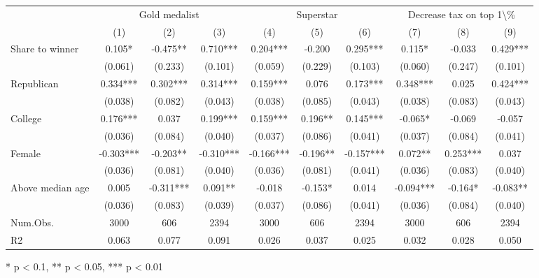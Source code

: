 \begin{table}[t]
\fontsize{12.0pt}{14.4pt}\selectfont
\begin{tabular*}{\linewidth}{@{\extracolsep{\fill}}lccccccccc}
\toprule
 & \multicolumn{3}{c}{Gold medalist} & \multicolumn{3}{c}{Superstar} & \multicolumn{3}{c}{Decrease tax on top 1\textbackslash{}\%} \\ 
\cmidrule(lr){2-4} \cmidrule(lr){5-7} \cmidrule(lr){8-10}
  & (1) & (2) & (3) & (4) & (5) & (6) & (7) & (8) & (9) \\ 
\midrule\addlinespace[2.5pt]
Share to winner & 0.105* & -0.475** & 0.710*** & 0.204*** & -0.200 & 0.295*** & 0.115* & -0.033 & 0.429*** \\ 
 & (0.061) & (0.233) & (0.101) & (0.059) & (0.229) & (0.103) & (0.060) & (0.247) & (0.101) \\ 
Republican & 0.334*** & 0.302*** & 0.314*** & 0.159*** & 0.076 & 0.173*** & 0.348*** & 0.025 & 0.424*** \\ 
 & (0.038) & (0.082) & (0.043) & (0.038) & (0.085) & (0.043) & (0.038) & (0.083) & (0.043) \\ 
College & 0.176*** & 0.037 & 0.199*** & 0.159*** & 0.196** & 0.145*** & -0.065* & -0.069 & -0.057 \\ 
 & (0.036) & (0.084) & (0.040) & (0.037) & (0.086) & (0.041) & (0.037) & (0.084) & (0.041) \\ 
Female & -0.303*** & -0.203** & -0.310*** & -0.166*** & -0.196** & -0.157*** & 0.072** & 0.253*** & 0.037 \\ 
 & (0.036) & (0.081) & (0.040) & (0.036) & (0.081) & (0.041) & (0.036) & (0.083) & (0.040) \\ 
Above median age & 0.005 & -0.311*** & 0.091** & -0.018 & -0.153* & 0.014 & -0.094*** & -0.164* & -0.083** \\ 
{} & {(0.036)} & {(0.083)} & {(0.039)} & {(0.037)} & {(0.086)} & {(0.041)} & {(0.036)} & {(0.084)} & {(0.040)} \\ 
Num.Obs. & 3000 & 606 & 2394 & 3000 & 606 & 2394 & 3000 & 606 & 2394 \\ 
R2 & 0.063 & 0.077 & 0.091 & 0.026 & 0.037 & 0.025 & 0.032 & 0.028 & 0.050 \\ 
\bottomrule
\end{tabular*}
\begin{minipage}{\linewidth}
* p < 0.1, ** p < 0.05, *** p < 0.01\\
\end{minipage}
\end{table}

